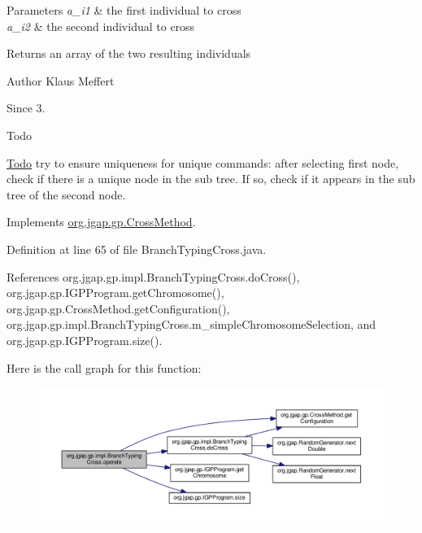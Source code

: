 \begin{DoxyParams}{Parameters}
{\em a\-\_\-i1} & the first individual to cross \\
\hline
{\em a\-\_\-i2} & the second individual to cross \\
\hline
\end{DoxyParams}
\begin{DoxyReturn}{Returns}
an array of the two resulting individuals
\end{DoxyReturn}
\begin{DoxyAuthor}{Author}
Klaus Meffert 
\end{DoxyAuthor}
\begin{DoxySince}{Since}
3. 
\end{DoxySince}
\begin{DoxyRefDesc}{Todo}
\item[\hyperlink{todo__todo000135}{Todo}]try to ensure uniqueness for unique commands\-: after selecting first node, check if there is a unique node in the sub tree. If so, check if it appears in the sub tree of the second node. \end{DoxyRefDesc}


Implements \hyperlink{classorg_1_1jgap_1_1gp_1_1_cross_method_afe487df2227dfcb1bc80ad0beab6c342}{org.\-jgap.\-gp.\-Cross\-Method}.



Definition at line 65 of file Branch\-Typing\-Cross.\-java.



References org.\-jgap.\-gp.\-impl.\-Branch\-Typing\-Cross.\-do\-Cross(), org.\-jgap.\-gp.\-I\-G\-P\-Program.\-get\-Chromosome(), org.\-jgap.\-gp.\-Cross\-Method.\-get\-Configuration(), org.\-jgap.\-gp.\-impl.\-Branch\-Typing\-Cross.\-m\-\_\-simple\-Chromosome\-Selection, and org.\-jgap.\-gp.\-I\-G\-P\-Program.\-size().



Here is the call graph for this function\-:
\nopagebreak
\begin{figure}[H]
\begin{center}
\leavevmode
\includegraphics[width=350pt]{classorg_1_1jgap_1_1gp_1_1impl_1_1_branch_typing_cross_ac9c1c1bf7edeadd26dccbcdd9d33ffc3_cgraph}
\end{center}
\end{figure}




